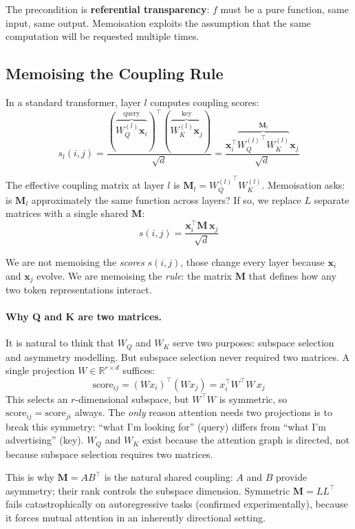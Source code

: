 \documentclass[11pt, a4paper]{article}
\newcommand{\M}{\mathbf{M}}
\newcommand{\x}{\mathbf{x}}
\newcommand{\R}{\mathbb{R}}
\theoremstyle{remark}
\begin{document}
The precondition is \textbf{referential transparency}: $f$ must be a pure function, same input, same output.
Memoisation exploits the assumption that the same computation will be requested multiple times.

\subsection{Memoising the Coupling Rule}

In a standard transformer, layer $l$ computes coupling scores:
\begin{equation}
    s_l(i,j) = \frac{(\overbrace{W_Q^{(l)} \x_i}^{\text{query}})^\top (\overbrace{W_K^{(l)} \x_j}^{\text{key}})}{\sqrt{d}}
    = \frac{\x_i^\top \overbrace{{W_Q^{(l)}}^\top W_K^{(l)}}^{\M_l} \x_j}{\sqrt{d}}
\end{equation}

The effective coupling matrix at layer $l$ is $\M_l = {W_Q^{(l)}}^\top W_K^{(l)}$.
Memoisation asks: is $\M_l$ approximately the same function across layers?
If so, we replace $L$ separate matrices with a single shared $\M$:
\begin{equation}
    s(i,j) = \frac{\x_i^\top \M\, \x_j}{\sqrt{d}}
\end{equation}

We are not memoising the \emph{scores} $s(i,j)$, those change every layer because $\x_i$ and $\x_j$ evolve.
We are memoising the \emph{rule}: the matrix $\M$ that defines how any two token representations interact.

\paragraph{Why Q and K are two matrices.}
It is natural to think that $W_Q$ and $W_K$ serve two purposes: subspace selection and asymmetry modelling.
But subspace selection never required two matrices.
A single projection $W \in \R^{r \times d}$ suffices:
\[
\text{score}_{ij} = (Wx_i)^\top(Wx_j) = x_i^\top W^\top W \, x_j
\]
This selects an $r$-dimensional subspace, but $W^\top W$ is symmetric, so $\text{score}_{ij} = \text{score}_{ji}$ always.
The \emph{only} reason attention needs two projections is to break this symmetry: ``what I'm looking for'' (query) differs from ``what I'm advertising'' (key).
$W_Q$ and $W_K$ exist because the attention graph is directed, not because subspace selection requires two matrices.

This is why $\M = AB^\top$ is the natural shared coupling: $A$ and $B$ provide asymmetry; their rank controls the subspace dimension.
Symmetric $\M = LL^\top$ fails catastrophically on autoregressive tasks (confirmed experimentally), because it forces mutual attention in an inherently directional setting.
\end{document}
